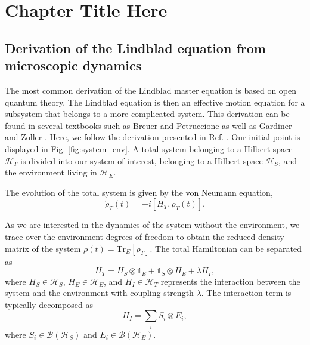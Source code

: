 
\chapter{Chapter Title Here} %

\label{ChapterX} %


\section{Derivation of the Lindblad equation from microscopic dynamics}

The most common derivation of the Lindblad master equation is based on open quantum theory. The Lindblad equation is then an effective motion equation for a subsystem that belongs to a more complicated system. This derivation can be found in several textbooks such as Breuer and Petruccione \cite{breuer_theory_2009} as well as Gardiner and Zoller \cite{Gardiner2004}. Here, we follow the derivation presented in Ref. \cite{Lindblad1976}. Our initial point is displayed in Fig. \ref{fig:system_env}. A total system belonging to a Hilbert space $\mathcal{H}_T$ is divided into our system of interest, belonging to a Hilbert space $\mathcal{H}_S$, and the environment living in $\mathcal{H}_E$.

The evolution of the total system is given by the von Neumann equation,
\begin{equation}
    \dot{\rho}_T(t) = -i[H_T, \rho_T(t)].
\end{equation}

As we are interested in the dynamics of the system without the environment, we trace over the environment degrees of freedom to obtain the reduced density matrix of the system $\rho(t) = \mathrm{Tr}_E[\rho_T]$. The total Hamiltonian can be separated as
\begin{equation}
    H_T = H_S \otimes \mathbb{1}_E + \mathbb{1}_S \otimes H_E + \lambda H_I,
\end{equation}
where $H_S \in \mathcal{H}_S$, $H_E \in \mathcal{H}_E$, and $H_I \in \mathcal{H}_T$ represents the interaction between the system and the environment with coupling strength $\lambda$. The interaction term is typically decomposed as
\begin{equation}
    H_I = \sum_i S_i \otimes E_i,
\end{equation}
where $S_i \in \mathcal{B}(\mathcal{H}_S)$ and $E_i \in \mathcal{B}(\mathcal{H}_E)$.

